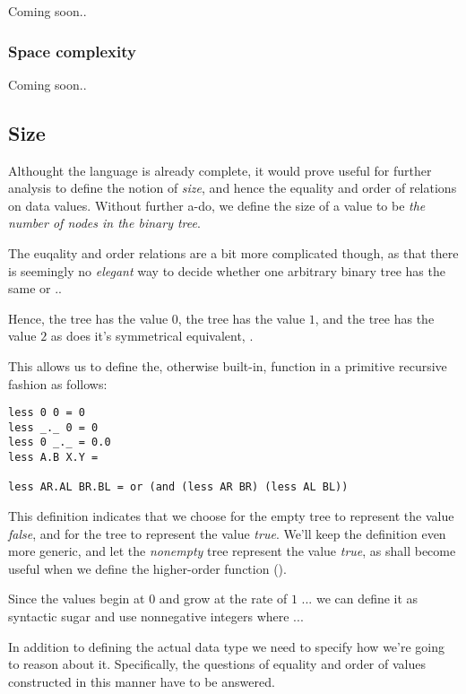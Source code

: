 Coming soon..

\subsubsection{Space complexity}

Coming soon..

\subsection{Size}

Althought the language is already complete, it would prove useful for further
analysis to define the notion of \emph{size}, and hence the equality and order
of relations on data values. Without further a-do, we define the size of a
value to be \emph{the number of nodes in the binary tree}.

The euqality and order relations are a bit more complicated though, as that
there is seemingly no \emph{elegant} way to decide whether one arbitrary binary
tree has the same or ..

Hence, the tree  has the value $0$, the tree  has the value
$1$, and the tree  has the value $2$ as does it's symmetrical
equivalent, .

This allows us to define the, otherwise built-in, function  in a
primitive recursive fashion as follows:

\begin{verbatim}
less 0 0 = 0
less _._ 0 = 0
less 0 _._ = 0.0
less A.B X.Y = 

less AR.AL BR.BL = or (and (less AR BR) (less AL BL))
\end{verbatim}

This definition indicates that we choose for the empty tree to represent the
value \emph{false}, and for the tree  to represent the value
\emph{true}. We'll keep the definition even more generic, and let the
\emph{nonempty} tree represent the value \emph{true}, as shall become useful
when we define the higher-order function 
().

Since the values begin at $0$ and grow at the rate of $1$ ... we can define it
as syntactic sugar and use nonnegative integers where ...

In addition to defining the actual data type we need to specify how we're going
to reason about it. Specifically, the questions of equality and order of values
constructed in this manner have to be answered.

